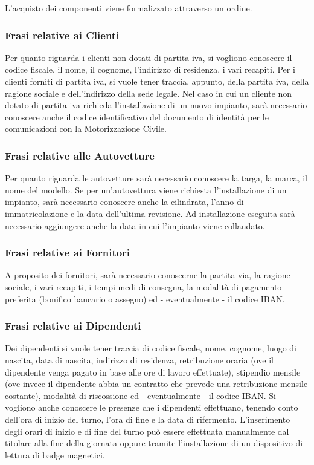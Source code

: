 			L'acquisto dei componenti viene formalizzato attraverso un ordine.
			
		\subsubsection{Frasi relative ai Clienti}
		
			Per quanto riguarda i clienti non dotati di partita iva, si vogliono conoscere il codice fiscale, il nome, il cognome, l’indirizzo di residenza, i vari recapiti. Per i clienti forniti di partita iva, si vuole tener traccia, appunto, della partita iva, della ragione sociale e dell’indirizzo della sede legale. 
			Nel caso in cui un cliente non dotato di partita iva richieda l’installazione di un nuovo impianto, sarà necessario conoscere anche il codice identificativo del documento di identità per le comunicazioni con la Motorizzazione Civile.
		
		\subsubsection{Frasi relative alle Autovetture}
			
			Per quanto riguarda le autovetture sarà necessario conoscere la targa, la marca, il nome del modello. Se per un’autovettura viene richiesta l’installazione di un impianto, sarà necessario conoscere anche la cilindrata, l’anno di immatricolazione e la data dell’ultima revisione. Ad installazione eseguita sarà necessario aggiungere anche la data in cui l'impianto viene collaudato.
		
		\subsubsection{Frasi relative ai Fornitori}
			
			A proposito dei fornitori, sarà necessario conoscerne la partita via, la ragione sociale, i vari recapiti, i tempi medi di consegna, la modalità di pagamento preferita (bonifico bancario o assegno) ed - eventualmente - il codice IBAN.
		
		\subsubsection{Frasi relative ai Dipendenti} 
			
			Dei dipendenti si vuole tener traccia di codice fiscale, nome, cognome, luogo di nascita, data di nascita, indirizzo di residenza, retribuzione oraria (ove il dipendente venga pagato in base alle ore di lavoro effettuate), stipendio mensile (ove invece il dipendente abbia un contratto che prevede una retribuzione mensile costante), modalità di riscossione ed - eventualmente - il codice IBAN. Si vogliono anche conoscere le presenze che i dipendenti effettuano, tenendo conto dell’ora di inizio del turno, l’ora di fine e la data di rifermento. 
			L'inserimento degli orari di inizio e di fine del turno può essere effettuata manualmente dal titolare alla fine della giornata oppure tramite l'installazione di un dispositivo di lettura di badge magnetici.
			
